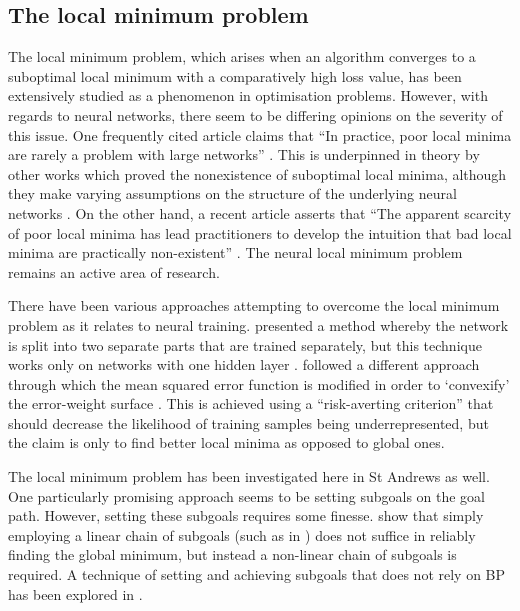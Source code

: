 \subsection{The local minimum problem}
\label{sec:context_local_minimum_problem}
The local minimum problem, which arises when an algorithm converges to a suboptimal local minimum with a comparatively high loss value, has been extensively studied as a phenomenon in optimisation problems.
However, with regards to neural networks, there seem to be differing opinions on the severity of this issue. 
One frequently cited article claims that ``In practice, poor local minima are rarely a problem with large networks'' \cite{lecun2015}.
This is underpinned in theory by other works which proved the nonexistence of suboptimal local minima, although they make varying assumptions on the structure of the underlying neural networks \cite{kawaguchi2016,nguyen2018,laurent2018}.
On the other hand, a recent article asserts that ``The apparent scarcity of poor local minima has lead practitioners to develop the intuition that bad local minima \elide are practically non-existent'' \cite{goldblum2019}.
The neural local minimum problem remains an active area of research.

There have been various approaches attempting to overcome the local minimum problem as it relates to neural training.
\citeauthor{choi2008} presented a method whereby the network is split into two separate parts that are trained separately, but this technique works only on networks with one hidden layer \cite*{choi2008}.
\citeauthor{lo2012} followed a different approach through which the mean squared error function is modified in order to `convexify' the error-weight surface \cite*{lo2012,lo2017}.
This is achieved using a ``risk-averting criterion'' that should decrease the likelihood of training samples being underrepresented, but the claim is only to find better local minima as opposed to global ones.

The local minimum problem has been investigated here in St Andrews as well. 
One particularly promising approach seems to be setting subgoals on the goal path.
However, setting these subgoals requires some finesse.
\textcite{lewis1999} show that simply employing a linear chain of subgoals (such as in \textcite{gorse1997}) does not suffice in reliably finding the global minimum, but instead a non-linear chain of subgoals is required.
A technique of setting and achieving subgoals that does not rely on BP has been explored in \textcite{weir2000}.

